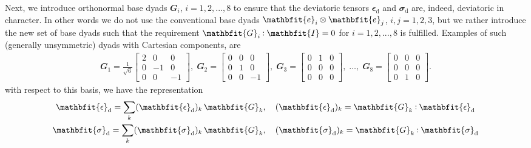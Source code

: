 \documentclass[12pt,a4paper]{article}
\renewcommand{\ta}[1]{\mathbfit{#1}}
\renewcommand{\ts}[1]{\mathbfit{#1}}
\renewcommand{\tf}[1]{\mathbfsfup{#1}}
\renewcommand{\dev}{\mathrm{d}}
\begin{document}
Next, we introduce orthonormal base dyads $\ts G_i$, $i = 1,2,...,8$ to ensure that the deviatoric tensors $\ts\epsilon_\dev$ and $\ts\sigma_\dev$ are, indeed, deviatoric in character.
In other words we do not use the conventional base dyads $\ta e_i\outerp\ta e_j$, $i,j=1,2,3$, but we rather introduce the new set of base dyads such that the requirement $\ts G_i \dprod \ta I = 0$ for $i=1,2,...,8$ is fulfilled.
Examples of such (generally unsymmetric) dyads with Cartesian components, are
\begin{equation}
\begin{gathered}
 \ts G_1 = \frac{1}{\sqrt{6}}\left[\begin{smallmatrix} 2 & 0 & 0\\ 0 & -1 & 0\\ 0 & 0 & -1\end{smallmatrix}\right],\;
 \ts G_2 = \left[\begin{smallmatrix} 0 & 0 & 0\\ 0 & 1 & 0 \\ 0 & 0 & -1\end{smallmatrix}\right],\;
 \ts G_3 = \left[\begin{smallmatrix} 0 & 1 & 0\\ 0 & 0 & 0 \\ 0 & 0 & 0\end{smallmatrix}\right],\;
 \ldots,\;
 \ts G_8 = \left[\begin{smallmatrix} 0 & 0 & 0\\ 0 & 0 & 0 \\ 0 & 1 & 0\end{smallmatrix}\right].
\end{gathered}
\end{equation}
with respect to this basis, we have the representation
\begin{gather}
 \ts\epsilon_\dev = \sum_k (\ts\epsilon_\dev)_k \, \ts G_k,\quad 
 (\ts\epsilon_\dev)_k = \ts G_k \dprod \ts\epsilon_\dev
\\
 \ts\sigma_\dev = \sum_k (\ts\sigma_\dev)_k \, \ts G_k,\quad
 (\ts\sigma_\dev)_k = \ts G_k \dprod \ts\sigma_\dev
\end{gather}
\end{document}
